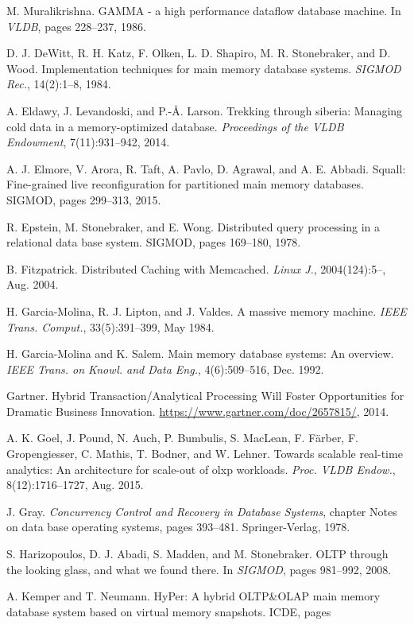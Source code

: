 \documentclass[a4paper,12pt,notitlepage,twoside,openright]{article}
\begin{document}
\begin{enumerate}[label={[}\arabic*{]}]
  M. Muralikrishna. GAMMA - a high performance dataflow database
  machine. In \emph{VLDB}, pages 228--237, 1986.
\item
  D. J. DeWitt, R. H. Katz, F. Olken, L. D. Shapiro, M. R. Stonebraker,
  and D. Wood. Implementation techniques for main memory database
  systems. \emph{SIGMOD Rec.}, 14(2):1--8, 1984.
\item
  A. Eldawy, J. Levandoski, and P.-\r{A}. Larson. Trekking through siberia:
  Managing cold data in a memory-optimized database. \emph{Proceedings
  of the VLDB Endowment}, 7(11):931--942, 2014.
\item
  A. J. Elmore, V. Arora, R. Taft, A. Pavlo, D. Agrawal, and A. E.
  Abbadi. Squall: Fine-grained live reconfiguration for partitioned main
  memory databases. SIGMOD, pages 299--313, 2015.
\item
  R. Epstein, M. Stonebraker, and E. Wong. Distributed query processing
  in a relational data base system. SIGMOD, pages 169--180, 1978.
\item
  B. Fitzpatrick. Distributed Caching with Memcached.
  \emph{Linux J.}, 2004(124):5--, Aug. 2004.
\item
  H. Garcia-Molina, R. J. Lipton, and J. Valdes. A massive memory
  machine. \emph{IEEE Trans. Comput.}, 33(5):391--399, May 1984.
\item
  H. Garcia-Molina and K. Salem. Main memory database systems: An
  overview. \emph{IEEE Trans. on Knowl. and Data Eng.}, 4(6):509--516,
  Dec. 1992.
\item
  Gartner. Hybrid Transaction/Analytical Processing Will Foster
  Opportunities for Dramatic Business Innovation.
  \url{https://www.gartner.com/doc/2657815/}, 2014.
\item A. K. Goel, J.
Pound, N. Auch, P. Bumbulis,
S. MacLean, F. F\"{a}rber, F. Gropengiesser, C. Mathis, T. Bodner, and W.
Lehner. Towards scalable real-time analytics: An architecture for
scale-out of olxp workloads. \emph{Proc. VLDB Endow.}, 8(12):1716--1727,
Aug. 2015.
\item
  J. Gray. \emph{Concurrency Control and Recovery in Database Systems},
  chapter Notes on data base operating systems, pages 393--481.
  Springer-Verlag, 1978.
\item
  S. Harizopoulos, D. J. Abadi, S. Madden, and M. Stonebraker. OLTP
  through the looking glass, and what we found there. In \emph{SIGMOD},
  pages 981--992, 2008.
\item
  A. Kemper and T. Neumann. HyPer: A hybrid OLTP\&OLAP main memory
  database system based on virtual memory snapshots. ICDE, pages

\end{enumerate}
\end{document}
